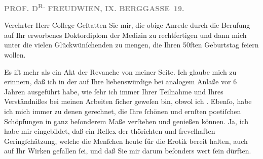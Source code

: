 \pstart
           \textcolor{gray}{\textbf{PROF. D\textsuperscript{R.} FREUD}}\hfill \textcolor{gray}{\textbf{WIEN, IX. BERGGASSE 19.}}\pend
           
\pstart\center{}Verehrter Herr College\pend\vspace{0.5em}
\pstart
           Geſtatten Sie mir, die obige Anrede durch die Berufung auf Ihr \label{K_L03886-1v}\label{K_L03886-1} erworbenes
               Doktordiplom der Medizin zu rechtfertigen und dann mich unter die vielen
               Glückwünſchenden zu mengen, die Ihren 50ſten Geburtstag feiern wollen.\pend
           
\pstart
           Es iſt mehr als ein Akt der Revanche von meiner Seite. Ich glaube mich zu erinnern,
               daß ich in der \label{K_L03886-2v}\label{K_L03886-2} auf Ihre liebenswürdige
                  \label{K_L03886-3v}\label{K_L03886-3} bei analogem Anlaße vor 6
               Jahren ausgeführt habe, wie{ }ſehr ich immer Ihrer Teilnahme und Ihres Verständnißes
               bei meinen Arbeiten{ }ſicher geweſen bin, obwol ich \label{K_L03886-4v}\label{K_L03886-4}. Ebenſo, habe ich mich immer zu denen gerechnet, die
               Ihre{ }ſchönen und ernſten poetiſchen Schöpfungen in ganz beſonderem Maße verſtehen und
               genießen können. Ja, ich habe mir eingebildet, daß ein Reflex der thörichten und
               frevelhaften Gering{\pb}ſchätzung, welche die Menſchen
               heute für die Erotik bereit halten, auch auf Ihr Wirken gefallen{ }ſei, und daß Sie mir
               darum beſonders wert{ }ſein dürften.\pend
           
